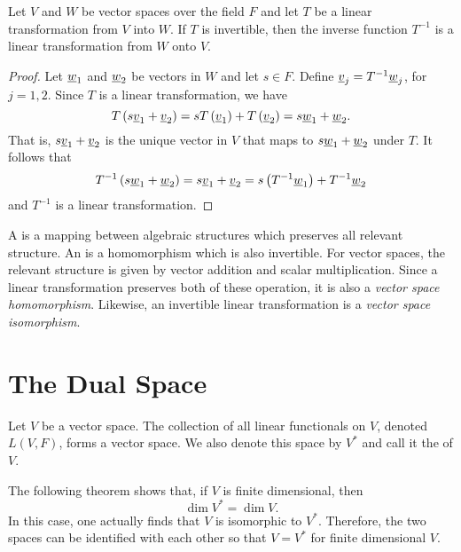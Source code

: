 \begin{theorem}
Let $V$ and $W$ be vector spaces over the field $F$ and let $T$ be a linear transformation from $V$ into $W$.
If $T$ is invertible, then the inverse function $T^{-1}$ is a linear transformation from $W$ onto $V$.
\end{theorem}
\begin{proof}
Let $\underline{w}_1$ and $\underline{w}_2$ be vectors in $W$ and let $s \in F$.
Define $\underline{v}_j = T^{-1} \underline{w}_j$, for $j =1,2$.
Since $T$ is a linear transformation, we have
\begin{equation*}
T \left( s \underline{v}_1 + \underline{v}_2 \right)
= s T \left( \underline{v}_1 \right) + T \left( \underline{v}_2 \right)
= s \underline{w}_1 + \underline{w}_2.
\end{equation*}
That is, $s \underline{v}_1 + \underline{v}_2$ is the unique vector in $V$ that maps to $s \underline{w}_1 + \underline{w}_2$ under $T$.
It follows that
\begin{equation*}
T^{-1} \left( s \underline{w}_1 + \underline{w}_2 \right)
= s \underline{v}_1 + \underline{v}_2
= s \left( T^{-1} \underline{w}_1 \right) + T^{-1} \underline{w}_2
\end{equation*}
and $T^{-1}$ is a linear transformation.
\end{proof}

A  is a mapping between algebraic structures which preserves all relevant structure.
An  is a homomorphism which is also invertible.
For vector spaces, the relevant structure is given by vector addition and scalar multiplication.
Since a linear transformation preserves both of these operation, it is also a \emph{vector space homomorphism}.
Likewise, an invertible linear transformation is a \emph{vector space isomorphism}.

\section{The Dual Space}

\begin{definition}
Let $V$ be a vector space.
The collection of all linear functionals on $V$, denoted $L(V,F)$, forms a vector space.
We also denote this space by $V^*$ and call it the  of $V$.
\end{definition}

The following theorem shows that, if $V$ is finite dimensional, then
\begin{equation*}
\dim V^* = \dim V.
\end{equation*}
In this case, one actually finds that $V$ is isomorphic to $V^*$.
Therefore, the two spaces can be identified with each other so that $V=V^*$ for finite dimensional $V$.

